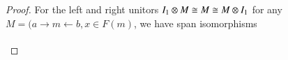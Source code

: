 \documentclass[reqno]{amsart}
\begin{document}
\begin{proof}
\begin{comment}
(C) edge node[above]{$(o_1+o_2)+o_3$} (B);
\end{tikzpicture}
\]
where $(x_1+x_2)+x_3 \maps 1 \to F((m_1+m_2)+m_3)$ is the composite
\[  1 \xrightarrow{(x_1 \times x_2) \times x_3} (F(m_1) \times F(m_2)) \times F(m_3) \xrightarrow{\phi_{m_1,m_2} \times 1} F(m_1+m_2) \times F(m_3) \xrightarrow{\phi_{m_1+m_2,m_3}} F((m_1+m_2)+m_3).\]
The other parenthesization $M_1 \otimes (M_2 \otimes M_3)$ is given by:
\[
\begin{tikzpicture}[scale=1.5]
\node (A) at (0,0) {$a_1+(a_2+a_3)$};
\node (B) at (2.5,0) {$m_1+(m_2+m_3)$};
\node (C) at (5,0) {$b_1+(b_2+b_3)$};
\node (D) at (2.5,-0.5) {$x_1+(x_2+x_3) \in F(m_1+(m_2+m_3))$};
\path[->,font=\scriptsize,>=angle 90]
(A) edge node[above]{$i_1+(i_2+i_3)$} (B)
(C) edge node[above]{$o_1+(o_2+o_3)$} (B);
\end{tikzpicture}
\]
where $x_1+(x_2+x_3) \maps 1 \to F(m_1+(m_2+m_3))$ is the composite
\[  1 \xrightarrow{x_1 \times (x_2 \times x_3)} F(m_1) \times (F(m_2) \times F(m_3)) \xrightarrow{1 \times \phi_{m_2,m_3}} F(m_1) \times F(m_2+m_3) \xrightarrow{\phi_{m_1,m_2+m_3}} F(m_1+(m_2+m_3)).\]
Denoting the associator of $(\A,+)$ by $\alpha$, the associator of $F\lCsp_1$ is then a map of cospans in $\A$ from $(M_1 \otimes M_2) \otimes M_3$ to $M_1 \otimes (M_2 \otimes M_3)$ given by:
\[
\begin{tikzpicture}[scale=1.5]
\node (A) at (0,0.5) {$(a_1+a_2)+a_3$};
\node (A') at (0,-0.5) {$a_1+(a_2+a_3)$};
\node (B) at (2.25,0.5) {$(m_1+m_2)+m_3$};
\node (C) at (4.5,0.5) {$(b_1+b_2)+b_3$};
\node (C') at (4.5,-0.5) {$b_1+(b_2+b_3)$};
\node (D) at (2.25,-0.5) {$m_1+(m_2+m_3)$};
\node (E) at (7,0.5) {$(x_1+x_2)+x_3 \in F((m_1+m_2)+m_3)$};
\node (F) at (7,-0.5) {$x_1+(x_2+x_3) \in F(m_1+(m_2+m_3))$};
\path[->,font=\scriptsize,>=angle 90]
(A) edge node[above]{$(i_1+i_2)+i_3$} (B)
(C) edge node[above]{$(o_1+o_2)+o_3$} (B)
(A) edge node[left]{$\alpha$} (A')
(C) edge node[right]{$\alpha$} (C')
(A') edge node [above]{$i_1+(i_2+i_3)$} (D)
(C') edge node [above]{$o_1+(o_2+o_3)$} (D)
(B) edge node [left] {$\alpha$} (D);
\end{tikzpicture}
\]
together with the decoration isomorphism $\tau_\alpha \maps F(\alpha)((x_1+x_2)+x_3) \to x_1+(x_2+x_3)$.
\end{comment}
For the left and right unitors $I_1\otimes M\cong M\cong M\otimes I_1$ for any $M=(a\to m\leftarrow b,x\in F(m)$, we have span isomorphisms
\begin{displaymath}
 \begin{tikzcd}[column sep=.3in]

\end{tikzcd}
\end{displaymath}
\end{proof}
\end{document}
